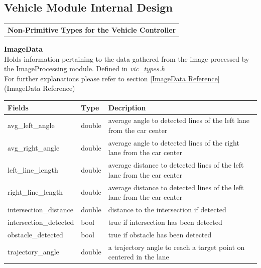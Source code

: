 \documentclass [10pt]{article}
\begin{document}
\subsection{Vehicle Module Internal Design}

\begin{longtable}{p{}}

\rowcolor{tableCell}\textbf{Non-Primitive Types for the Vehicle Controller} \\
\end{longtable}
\textbf{ImageData}\\
\indent Holds information pertaining to the data gathered from the image processed by the ImageProcessing module. Defined in \textit{vic\_types.h} \\

For further explanations please refer to section \ref{ImageData Reference} (ImageData Reference) \\






\begin{longtable}{ |p{ }  | p{ }| p{ } |} \hline
    \textbf{Fields} & \textbf{Type}  & \textbf{Decription}\\ \hline
    \rowcolor{tableCell}avg\_left\_angle & double & average angle to detected lines  of the left lane from the car center\\ \hline
    avg\_right\_angle & double & average angle to detected lines  of the right lane from the car center \\ \hline
    \rowcolor{tableCell}left\_line\_length & double & average distance to detected lines  of the left lane from the car center \\ \hline
    right\_line\_length& double & average distance to detected lines  of the left lane from the car center \\ \hline
    \rowcolor{tableCell}intersection\_distance & double & distance to the intersection if detected \\ \hline
    intersection\_detected & bool & true if intersection has been detected \\ \hline
    \rowcolor{tableCell}obstacle\_detected & bool & true if obstacle has been detected \\ \hline
    trajectory\_angle & double & a trajectory angle to reach a target point on centered in the lane \\  \hline
    
\end{longtable}
\end{document}
